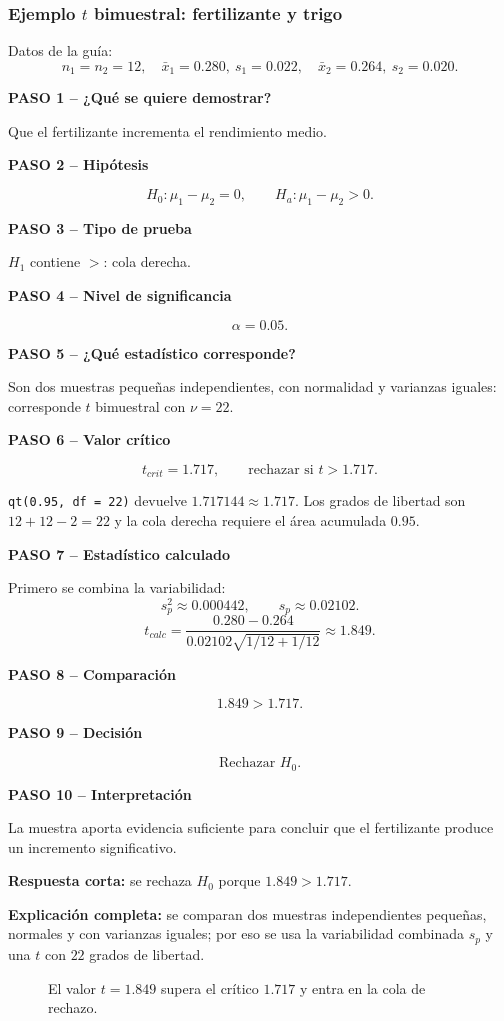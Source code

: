 \documentclass[11pt,a4paper]{article}
\newcommand{\paso}[2]{\par\medskip\noindent\textbf{PASO #1 -- #2}\par}
\begin{document}
\subsubsection{\texorpdfstring{Ejemplo $t$ bimuestral: fertilizante y trigo}{Ejemplo t bimuestral: fertilizante y trigo}}

Datos de la guía:
\[
n_1=n_2=12,\quad
\bar{x}_1=0.280,\ s_1=0.022,\quad
\bar{x}_2=0.264,\ s_2=0.020.
\]
\paso{1}{¿Qué se quiere demostrar?} Que el fertilizante incrementa el rendimiento medio.
\paso{2}{Hipótesis}
\[
H_0:\mu_1-\mu_2=0,
\qquad
H_a:\mu_1-\mu_2>0.
\]
\paso{3}{Tipo de prueba} $H_1$ contiene $>$: cola derecha.
\paso{4}{Nivel de significancia} \[\alpha=0.05.\]
\paso{5}{¿Qué estadístico corresponde?} Son dos muestras pequeñas independientes, con normalidad y varianzas iguales: corresponde $t$ bimuestral con $\nu=22$.
\paso{6}{Valor crítico} \[t_{crit}=1.717,\qquad \text{rechazar si }t>1.717.\]
\begin{calculor}
\texttt{qt(0.95, df = 22)} devuelve $1.717144\approx1.717$. Los grados de libertad son $12+12-2=22$ y la cola derecha requiere el área acumulada $0.95$.
\end{calculor}
\paso{7}{Estadístico calculado} Primero se combina la variabilidad:
\[
s_p^2\approx0.000442,
\qquad s_p\approx0.02102.
\]
\[
t_{calc}=\frac{0.280-0.264}{0.02102\sqrt{1/12+1/12}}\approx1.849.
\]
\paso{8}{Comparación} \[1.849>1.717.\]
\paso{9}{Decisión} \[\boxed{\text{Rechazar }H_0}.\]
\paso{10}{Interpretación} La muestra aporta evidencia suficiente para concluir que el fertilizante produce un incremento significativo.

\begin{preguntaoral}
\textbf{Respuesta corta:} se rechaza $H_0$ porque $1.849>1.717$.\par
\textbf{Explicación completa:} se comparan dos muestras independientes pequeñas, normales y con varianzas iguales; por eso se usa la variabilidad combinada $s_p$ y una $t$ con $22$ grados de libertad.
\end{preguntaoral}

\begin{figure}[H]
\centering
{}
\caption{El valor $t=1.849$ supera el crítico $1.717$ y entra en la cola de rechazo.}
\end{figure}
\end{document}

